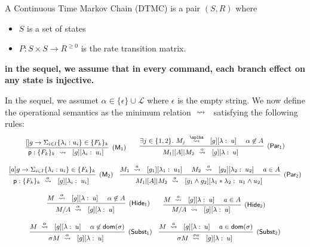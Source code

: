 \begin{definition}
  A Continuous Time Markov Chain (DTMC) is a pair $(S,R)$ where
  \begin{itemize}
  \item $S$ is a set of states
  \item $P: S\times S \rightarrow  R^{\geq 0}$ is the rate
    transition matrix.
  \end{itemize}
\end{definition}

\newpage

{\bf in the sequel, we assume that in every command, each branch
  effect on any state is injective.}


In the sequel, we assumet $\alpha\in\{\epsilon\}\cup \mathcal L$ where
$\epsilon$ is the empty string. We now define the operational
semantics as the minimum relation $\ \stackrel{}{\rightsquigarrow}\ {}$ satisfying the
following rules:
% 
\begin{displaymath}\small
  \begin{array}{ccc}
    \infer[\mathsf{(M_1)}]
    { {\role{p}:\{F_k\}_k} \prismred{}\lab{g}{\lambda_i}{u_i} }
    {\command {}g\lambda u\in\{F_k\}_k}
    \qquad
    \infer[\mathsf{(Par_1)}]
    {M_1\ppp A M_2\prismred{a}\lab g\lambda u }
    {
    \exists j\in\{1,2\}.\ 
    M_j\prismred{\aplha}\lab g\lambda u
    & \alpha\not\in A
    }
    \\\\
    \infer[\mathsf{(M_2)}]
    { {\role{p}:\{F_k\}_k} \prismred{a}\lab{g}{\lambda_i}{u_i} }
    {\command ag\lambda u\in\{F_k\}_k}
    \quad
    \infer[\mathsf{(Par_2)}]
    {M_1\ppp A M_2\prismred{a}\lab{g_1\land g_2}{\lambda_1*\lambda_2}{u_1\land u_2} }
    {
    M_1\prismred{a}\lab{g_1}{\lambda_1}{u_1} 
    & M_2\prismred{a}\lab{g_2}{\lambda_2}{u_2} 
                 & a\in A}
    \\\\\
    \infer[\mathsf{(Hide_1)}]
    {
    M/A\prismred{\alpha}\lab g\lambda u
    }
    {
    M\prismred{\alpha}\lab g\lambda u
    & \alpha\not\in A
    }
    \qquad
    \infer[\mathsf{(Hide_2)}]
    {
    M/A\prismred{}\lab g\lambda u
    }
    {
    M\prismred{a}\lab g\lambda u
    & a\in A
    }
    \\\\
    \infer[\mathsf{(Subst_1)}]
    {
    \sigma M\prismred{\alpha}\lab g\lambda u
    }
    {
    M\prismred{\alpha}\lab g\lambda u
    & \alpha\not\in\mathsf{dom}(\sigma)
      }
    \quad
    \infer[\mathsf{(Subst_2)}]
    {
    \sigma M\prismred{\sigma a}\lab g\lambda u
    }
    {
    M\prismred{a}\lab g\lambda u
    & a\in\mathsf{dom}(\sigma)
      }
    
  \end{array}
\end{displaymath}


